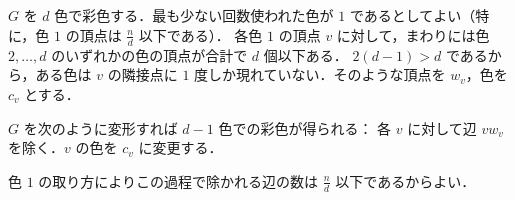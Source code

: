 \subsection{}
$G$ を $d$ 色で彩色する．最も少ない回数使われた色が $1$ であるとしてよい（特に，色 $1$ の頂点は $\frac{n}{d}$ 以下である）．
各色 $1$ の頂点 $v$ に対して，まわりには色 $2,\ldots,d$ のいずれかの色の頂点が合計で $d$ 個以下ある．
$2(d-1) > d$ であるから，ある色は $v$ の隣接点に $1$ 度しか現れていない．そのような頂点を $w_v$，色を $c_v$ とする．

$G$ を次のように変形すれば $d-1$ 色での彩色が得られる：
各 $v$ に対して辺 $vw_v$ を除く．$v$ の色を $c_v$ に変更する．

色 $1$ の取り方によりこの過程で除かれる辺の数は $\frac{n}{d}$ 以下であるからよい．